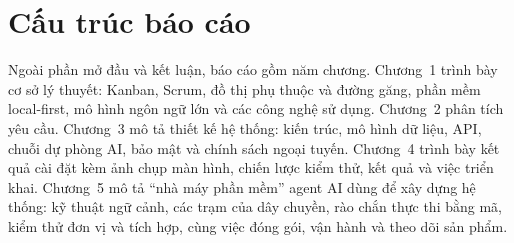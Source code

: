 \documentclass[../main.tex]{subfiles}
\begin{document}
\section{Cấu trúc báo cáo}
Ngoài phần mở đầu và kết luận, báo cáo gồm năm chương. Chương~1 trình bày cơ sở lý thuyết: Kanban,
Scrum, đồ thị phụ thuộc và đường găng, phần mềm local-first, mô hình ngôn ngữ lớn và các công nghệ sử
dụng. Chương~2 phân tích yêu cầu. Chương~3 mô tả thiết kế hệ thống: kiến trúc, mô hình dữ liệu, API,
chuỗi dự phòng AI, bảo mật và chính sách ngoại tuyến. Chương~4 trình bày kết quả cài đặt kèm ảnh chụp
màn hình, chiến lược kiểm thử, kết quả và việc triển khai. Chương~5 mô tả ``nhà máy phần mềm'' agent
AI dùng để xây dựng hệ thống: kỹ thuật ngữ cảnh, các trạm của dây chuyền, rào chắn thực thi bằng mã,
kiểm thử đơn vị và tích hợp, cùng việc đóng gói, vận hành và theo dõi sản phẩm.
\end{document}
